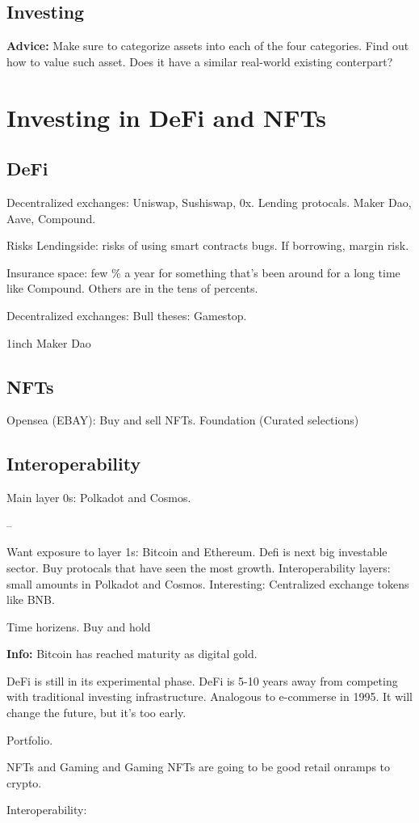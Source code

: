 \documentclass[10pt,twocolumn]{article}
\begin{document}
\subsection{Investing}

\textbf{Advice:} Make sure to categorize assets into each of the four
categories. Find out how to value such asset. Does it have a similar real-world
existing conterpart? 

\section{Investing in DeFi and NFTs}
\subsection{DeFi}
Decentralized exchanges: Uniswap, Sushiswap, 0x. 
Lending protocals. Maker Dao, Aave, Compound. 

Risks
Lendingside: risks of using smart contracts bugs. If borrowing, margin risk. 

Insurance space: few \% a year for something that's been around for a long time
like Compound. Others are in the tens of percents. 

Decentralized exchanges: 
Bull theses: Gamestop. 

1inch
Maker Dao

\subsection{NFTs}
Opensea (EBAY): Buy and sell NFTs. 
Foundation (Curated selections)

\subsection{Interoperability}
Main layer 0s: Polkadot and Cosmos. 

--

Want exposure to layer 1s: Bitcoin and Ethereum. Defi is next big investable
sector. Buy protocals that have seen the most growth. Interoperability layers:
small amounts in Polkadot and Cosmos. Interesting: Centralized exchange tokens
like BNB. 

Time horizens. Buy and hold

\textbf{Info:} Bitcoin has reached maturity as digital gold. 

\textbf{} DeFi is still in its experimental phase. DeFi is 5-10 years away from
competing with traditional investing infrastructure. Analogous to e-commerse in
1995. It will change the future, but it's too early. 

Portfolio.  


NFTs and Gaming and Gaming NFTs are going to be good retail onramps to crypto. 

Interoperability: 
\end{document}
